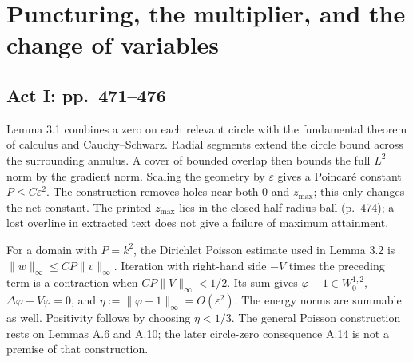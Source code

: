 \documentclass[10pt]{article}
\begin{document}
\section*{Puncturing, the multiplier, and the change of variables}
\subsection*{Act I: pp. 471–476}
Lemma 3.1 combines a zero on each relevant circle with the fundamental theorem of calculus and Cauchy–Schwarz. Radial segments extend the circle bound across the surrounding annulus. A cover of bounded overlap then bounds the full \(L^2\) norm by the gradient norm. Scaling the geometry by \(\varepsilon\) gives a Poincaré constant \(P\le C\varepsilon^2\). The construction removes holes near both \(0\) and \(z_{\max}\); this only changes the net constant. The printed \(z_{\max}\) lies in the closed half-radius ball (p. 474); a lost overline in extracted text does not give a failure of maximum attainment.\par
For a domain with \(P=k^2\), the Dirichlet Poisson estimate used in Lemma 3.2 is \(\|w\|_\infty\le CP\|v\|_\infty\). Iteration with right-hand side \(-V\) times the preceding term is a contraction when \(CP\|V\|_\infty<1/2\). Its sum gives \(\varphi-1\in W^{1,2}_0\), \(\Delta\varphi+V\varphi=0\), and \(\eta:=\|\varphi-1\|_\infty=O(\varepsilon^2)\). The energy norms are summable as well. Positivity follows by choosing \(\eta<1/3\). The general Poisson construction rests on Lemmas A.6 and A.10; the later circle-zero consequence A.14 is not a premise of that construction.\par
\end{document}
